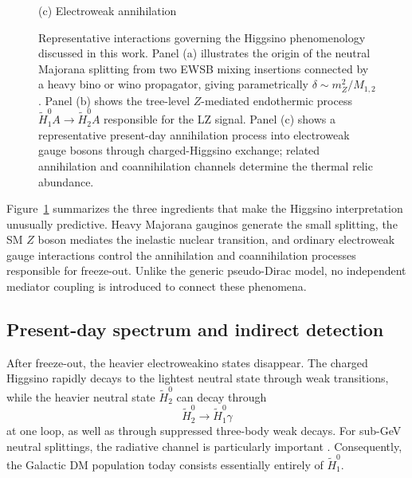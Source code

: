 \documentclass[aps,prd,reprint,superscriptaddress,nofootinbib,longbibliography,floatfix]{revtex4-2}
\begin{document}
\begin{figure}[t]
\begin{minipage}{0.31\textwidth}
\vspace{0.1cm}
{\small (c) Electroweak annihilation}
\end{minipage}

\caption{Representative interactions governing the Higgsino phenomenology discussed in this work. Panel (a) illustrates the origin of the neutral Majorana splitting from two EWSB mixing insertions connected by a heavy bino or wino propagator, giving parametrically $\delta\sim m_Z^2/M_{1,2}$. Panel (b) shows the tree-level $Z$-mediated endothermic process $\widetilde H_1^0 A\rightarrow\widetilde H_2^0 A$ responsible for the LZ signal. Panel (c) shows a representative present-day annihilation process into electroweak gauge bosons through charged-Higgsino exchange; related annihilation and coannihilation channels determine the thermal relic abundance.}
\label{fig:higgsino_feynman}
\end{figure}


Figure~\ref{fig:higgsino_feynman} summarizes the three ingredients that make the Higgsino interpretation unusually predictive. Heavy Majorana gauginos generate the small splitting, the SM $Z$ boson mediates the inelastic nuclear transition, and ordinary electroweak gauge interactions control the annihilation and coannihilation processes responsible for freeze-out. Unlike the generic pseudo-Dirac model, no independent mediator coupling is introduced to connect these phenomena.


\subsection{Present-day spectrum and indirect detection}

After freeze-out, the heavier electroweakino states disappear. The charged Higgsino rapidly decays to the lightest neutral state through weak transitions, while the heavier neutral state $\widetilde H_2^0$ can decay through
\begin{equation}
\widetilde H_2^0
\rightarrow
\widetilde H_1^0\gamma
\end{equation}
at one loop, as well as through suppressed three-body weak decays. For sub-GeV neutral splittings, the radiative channel is particularly important \cite{KrallReece2018}. Consequently, the Galactic DM population today consists essentially entirely of $\widetilde H_1^0$.
\end{document}
